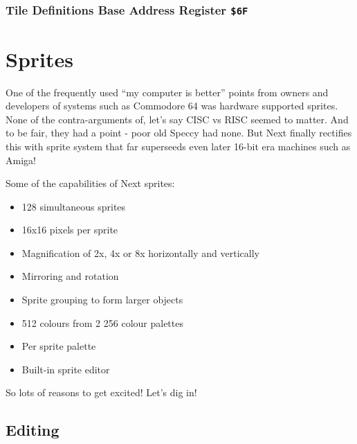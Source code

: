\documentclass[12pt,twoside,openright,a4paper]{book}
\begin{document}
\begin{NextPort}
\end{NextPort}


\subsubsection{Tile Definitions Base Address Register {\tt \$6F}}

\begin{NextPort}
\end{NextPort}


\pagebreak
\section{Sprites}

One of the frequently used ``my computer is better'' points from owners and developers of systems such as Commodore 64 was hardware supported sprites. None of the contra-arguments of, let's say CISC vs RISC seemed to matter. And to be fair, they had a point - poor old Speccy had none. But Next finally rectifies this with sprite system that far superseeds even later 16-bit era machines such as Amiga!

Some of the capabilities of Next sprites:

\begin{itemize}[topsep=1pt,itemsep=1pt]
	\item 128 simultaneous sprites
	\item 16x16 pixels per sprite
	\item Magnification of 2x, 4x or 8x horizontally and vertically
	\item Mirroring and rotation
	\item Sprite grouping to form larger objects
	\item 512 colours from 2 256 colour palettes
	\item Per sprite palette
	\item Built-in sprite editor
\end{itemize}

So lots of reasons to get excited! Let's dig in!

\subsection{Editing}
\end{document}
